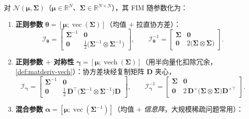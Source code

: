 \begin{proposition}\label{prop:matderiv-gauss-fim}
对 $\mathcal{N}(\boldsymbol{\mu},\boldsymbol{\Sigma})$（$\boldsymbol{\mu}\in\mathbb{R}^N$、$\boldsymbol{\Sigma}\in\mathbb{R}^{N\times N}$），其 FIM 随参数化为\cite{barfoot2024state,magnus2019matrix}：
\begin{enumerate}
  \item \textbf{正则参数} $\boldsymbol{\theta}=[\boldsymbol{\mu};\operatorname{vec}(\boldsymbol{\Sigma})]$（均值 $+$ 拉直协方差）：
  \begin{equation}
    \boldsymbol{\mathcal{I}}_{\boldsymbol{\theta}}=\begin{bmatrix}\boldsymbol{\Sigma}^{-1}&\mathbf{0}\\\mathbf{0}&\tfrac12\big(\boldsymbol{\Sigma}^{-1}\otimes\boldsymbol{\Sigma}^{-1}\big)\end{bmatrix},
    \qquad
    \boldsymbol{\mathcal{I}}_{\boldsymbol{\theta}}^{-1}=\begin{bmatrix}\boldsymbol{\Sigma}&\mathbf{0}\\\mathbf{0}&2\big(\boldsymbol{\Sigma}\otimes\boldsymbol{\Sigma}\big)\end{bmatrix}.
    \label{eq:matderiv-gauss-fim-canon}
  \end{equation}
  \item \textbf{正则参数 $+$ 对称性} $\boldsymbol{\gamma}=[\boldsymbol{\mu};\operatorname{vech}(\boldsymbol{\Sigma})]$（用半向量化扣除冗余，\cref{def:matderiv-vech}）：协方差块经复制矩阵 $\mathbf{D}$ 夹心，
  \begin{equation}
    \boldsymbol{\mathcal{I}}_{\boldsymbol{\gamma}}=\begin{bmatrix}\boldsymbol{\Sigma}^{-1}&\mathbf{0}\\\mathbf{0}&\tfrac12\,\mathbf{D}^\top\big(\boldsymbol{\Sigma}^{-1}\otimes\boldsymbol{\Sigma}^{-1}\big)\mathbf{D}\end{bmatrix},
    \qquad
    \boldsymbol{\mathcal{I}}_{\boldsymbol{\gamma}}^{-1}=\begin{bmatrix}\boldsymbol{\Sigma}&\mathbf{0}\\\mathbf{0}&2\,\mathbf{D}^{+}\big(\boldsymbol{\Sigma}\otimes\boldsymbol{\Sigma}\big)\mathbf{D}^{+\top}\end{bmatrix}.
    \label{eq:matderiv-gauss-fim-sym}
  \end{equation}
  \item \textbf{混合参数} $\boldsymbol{\alpha}=[\boldsymbol{\mu};\operatorname{vec}(\boldsymbol{\Sigma}^{-1})]$（均值 $+$ \emph{信息阵}，大规模稀疏问题常用）：

\end{enumerate}
\end{proposition}
